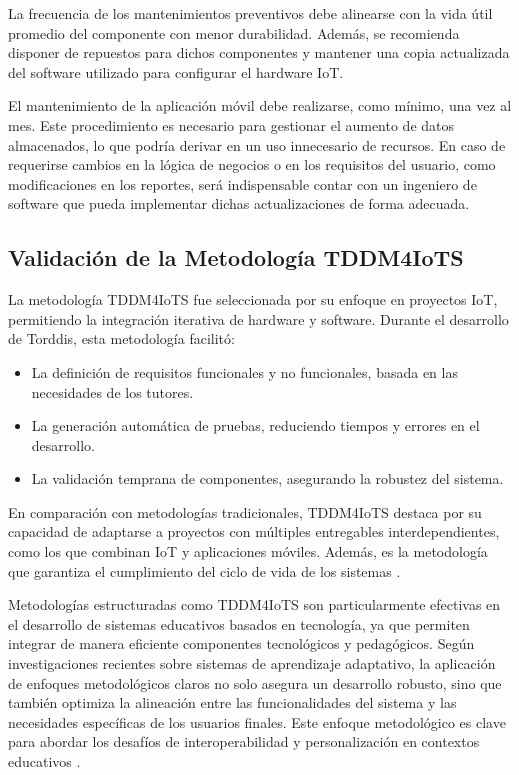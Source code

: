 \documentclass[a4paper,fleqn]{cas-sc}
\begin{document}
				La frecuencia de los mantenimientos preventivos debe alinearse con la vida útil promedio del componente con menor durabilidad. Además, se recomienda disponer de repuestos para dichos componentes y mantener una copia actualizada del software utilizado para configurar el hardware IoT.
				
				El mantenimiento de la aplicación móvil debe realizarse, como mínimo, una vez al mes. Este procedimiento es necesario para gestionar el aumento de datos almacenados, lo que podría derivar en un uso innecesario de recursos. En caso de requerirse cambios en la lógica de negocios o en los requisitos del usuario, como modificaciones en los reportes, será indispensable contar con un ingeniero de software que pueda implementar dichas actualizaciones de forma adecuada.
		
		\subsection{Validación de la Metodología TDDM4IoTS}
			La metodología TDDM4IoTS \citep{Guerrero-Ulloa2020TDDM4IoTS} fue seleccionada por su enfoque en proyectos IoT, permitiendo la integración iterativa de hardware y software. Durante el desarrollo de Torddis, esta metodología facilitó:
			
			\begin{itemize}
				\item La definición de requisitos funcionales y no funcionales, basada en las necesidades de los tutores.
				\item La generación automática de pruebas, reduciendo tiempos y errores en el desarrollo.
				\item La validación temprana de componentes, asegurando la robustez del sistema.
			\end{itemize}
			En comparación con metodologías tradicionales, TDDM4IoTS destaca por su capacidad de adaptarse a proyectos con múltiples entregables interdependientes, como los que combinan IoT y aplicaciones móviles. Además, es la metodología que garantiza el cumplimiento del ciclo de vida de los sistemas \citep{Guerrero2023Agile,ISO-IEC-IEEE12207-2017,ISO-IEC-IEEE12207-2017Application}.
		
			Metodologías estructuradas como TDDM4IoTS son particularmente efectivas en el desarrollo de sistemas educativos basados en tecnología, ya que permiten integrar de manera eficiente componentes tecnológicos y pedagógicos. Según investigaciones recientes sobre sistemas de aprendizaje adaptativo, la aplicación de enfoques metodológicos claros no solo asegura un desarrollo robusto, sino que también optimiza la alineación entre las funcionalidades del sistema y las necesidades específicas de los usuarios finales. Este enfoque metodológico es clave para abordar los desafíos de interoperabilidad y personalización en contextos educativos \citep{Wang2025Development}.
				
\end{document}
